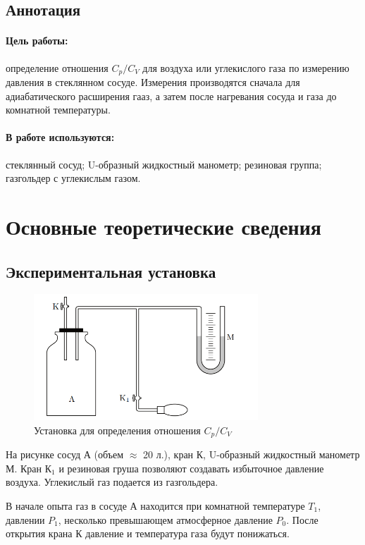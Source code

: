 \documentclass[a4paper,12pt]{report}
\begin{document}
	
	\newpage
    
    \subsection*{Аннотация}
        \paragraph*{Цель работы:} определение отношения $C_p/C_V$ для воздуха или углекислого газа по измерению давления в стеклянном сосуде. Измерения производятся сначала для адиабатического расширения гааз, а затем после нагревания сосуда и газа до комнатной температуры.
        \paragraph*{В работе используются:} стеклянный сосуд; U-образный жидкостный манометр; резиновая группа; газгольдер с углекислым газом.
    \section{Основные теоретические сведения}
    \subsection*{Экспериментальная установка}
        \begin{figure}[H]
            \includegraphics*[width=0.75\textwidth]{ustanovka.png}
            \centering
            \caption{Установка для определения отношения $C_p/C_V$}
        \end{figure}
        На рисунке сосуд А (объем $\approx$ 20 л.), кран К, U-образный жидкостный манометр М. Кран К$_1$ и резиновая груша позволяют создавать избыточное давление воздуха. Углекислый газ подается из газгольдера.

        В начале опыта газ в сосуде А находится при комнатной температуре $T_1$, давлении $P_1$, несколько превышающем атмосферное давление $P_0$. После открытия крана К давление и температура газа будут понижаться.
\end{document}
